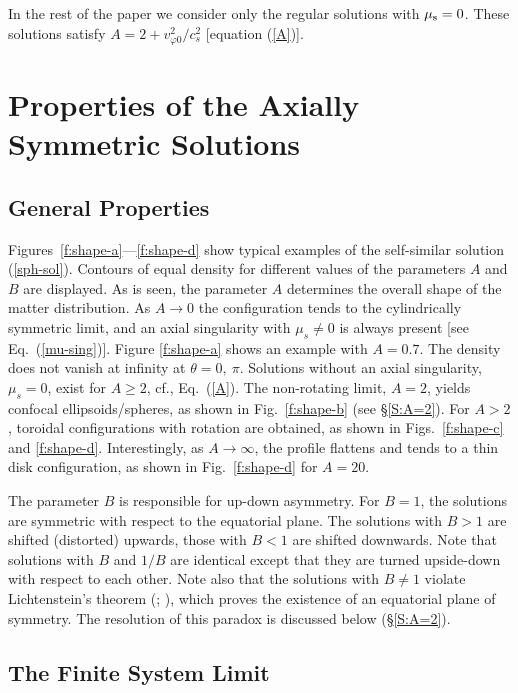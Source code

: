 In the rest of the paper we consider only the regular solutions with 
$\mu_{\rm s}=0$. These solutions satisfy $A=2+v_{\varphi 0}^2/c_s^2$
[equation (\ref{A})].


\section{Properties of the Axially Symmetric Solutions \label{S:PROP} }

\subsection{General Properties}

Figures\ \ref{f:shape-a}---\ref{f:shape-d} show typical examples of the 
self-similar solution (\ref{sph-sol}). Contours of equal density for 
different values of the parameters $A$ and $B$ are displayed. 
As is seen, the parameter $A$ determines the overall shape of the matter 
distribution. As $A\to0$ the configuration tends to the cylindrically 
symmetric limit, and an axial singularity with $\mu_s\not=0$ is always present
[see Eq.\ (\ref{mu-sing})]. Figure \ref{f:shape-a} shows an example with
$A=0.7$. The density does not vanish at infinity at $\theta=0,\ \pi$.
Solutions without an axial singularity, $\mu_s=0$, exist for $A\ge2$, 
cf., Eq.\ (\ref{A}). The non-rotating limit, $A=2$, yields confocal 
ellipsoids/spheres, as shown in Fig.\ \ref{f:shape-b} (see \S \ref{S:A=2}).
For $A>2$, toroidal configurations with rotation are obtained, as shown in 
Figs.\ \ref{f:shape-c} and \ref{f:shape-d}. Interestingly, as $A\to\infty$, the
profile flattens and tends to a thin disk configuration, as shown in Fig.\
\ref{f:shape-d} for $A=20$. 

The parameter $B$ is responsible for up-down asymmetry. For $B=1$, the 
solutions are symmetric with respect to the equatorial plane. The solutions 
with $B>1$ are shifted (distorted) upwards, those with $B<1$ are shifted 
downwards. Note that solutions with $B$ and $1/B$ are identical except
that they are turned upside-down with respect to each other. Note also that 
the solutions with $B\not=1$ violate Lichtenstein's theorem (\cite{Lich}; 
\cite{Wavre}), which proves the existence of an equatorial plane of symmetry.
The resolution of this paradox is discussed below (\S \ref{S:A=2}).

\subsection{The Finite System Limit}


